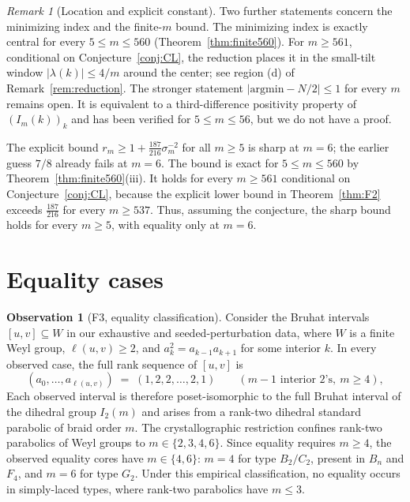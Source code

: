 \documentclass[11pt]{amsart}
\theoremstyle{plain}
\theoremstyle{definition}
\newtheorem{observation}[theorem]{Observation}
\theoremstyle{remark}
\newtheorem{remark}[theorem]{Remark}
\newcommand{\W}{W}
\begin{document}
\begin{remark}[Location and explicit constant]
Two further statements concern the minimizing index and the finite-$m$
bound. The minimizing index is exactly central for every
$5\le m\le560$ (Theorem~\ref{thm:finite560}). For $m\ge561$, conditional
on Conjecture~\ref{conj:CL}, the reduction places it in the small-tilt
window $|\lambda(k)|\le4/m$ around the center; see region (d) of
Remark~\ref{rem:reduction}. The stronger statement
$|\mathrm{argmin}-N/2|\le1$ for every $m$ remains open. It is equivalent
to a third-difference positivity property of $(I_m(k))_k$ and has been
verified for $5\le m\le56$, but we do not have a proof.

The explicit bound
$r_m\ge 1+\tfrac{187}{216}\sigma_m^{-2}$ for all $m\ge5$ is sharp at
$m=6$; the earlier guess $7/8$ already fails at $m=6$. The bound is exact
for $5\le m\le560$ by Theorem~\ref{thm:finite560}(iii). It holds for every
$m\ge561$ conditional on Conjecture~\ref{conj:CL}, because the explicit
lower bound in Theorem~\ref{thm:F2} exceeds $\tfrac{187}{216}$ for every
$m\ge537$. Thus, assuming the conjecture, the sharp bound holds for every
$m\ge5$, with equality only at $m=6$.
\end{remark}

\section{Equality cases}
\label{sec:F3}

\begin{observation}[F3, equality classification]
\label{obs:F3}
Consider the Bruhat intervals $[u,v]\subseteq\W$ in our exhaustive and
seeded-perturbation data, where $\W$ is a finite Weyl group,
$\ell(u,v)\ge2$, and $a_k^2=a_{k-1}a_{k+1}$ for some interior $k$. In
every observed case, the full rank sequence of $[u,v]$ is
\[
(a_0,\dots,a_{\ell(u,v)}) \;=\; (1,2,2,\dots,2,1) \qquad (m-1 \text{ interior
2's}, \ m\ge4),
\]
Each observed interval is therefore poset-isomorphic to the full Bruhat
interval of the dihedral group $I_2(m)$ and arises from a rank-two
dihedral standard parabolic of braid order $m$. The crystallographic
restriction confines rank-two parabolics of Weyl groups to
$m\in\{2,3,4,6\}$. Since equality requires $m\ge4$, the observed equality
cores have $m\in\{4,6\}$: $m=4$ for type $B_2/C_2$, present in $B_n$ and
$F_4$, and $m=6$ for type $G_2$. Under this empirical classification, no
equality occurs in simply-laced types, where rank-two parabolics have
$m\le3$.
\end{observation}
\end{document}

